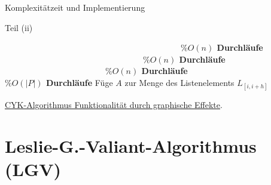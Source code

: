 \documentclass{beamer}
\begin{document}
	\begin{frame}{Komplexitätzeit und Implementierung}
		\begin{algorithm}[H]
			\caption[Teil (ii)]{Teil (ii)}
			\label{algorithm10}
			\begin{algorithmic}[1]
				 \ \ \ \ \ \ \ \ \ \ \ \ \ \ \ \ \ \ \ \ \ \ \ \ \ \ \ \ \ \ \ \ \ \ \ \ \ \ \ \ \ \ \textbf{$ \%O(n)$ Durchläufe}
				 \ \ \ \ \ \ \ \ \ \ \ \ \ \ \ \ \ \ \ \ \ \ \ \ \ \ \ \ \ \ \ \ \ \textbf{$ \%O(n)$ Durchläufe}
				 \ \ \ \ \ \ \ \ \ \ \ \ \ \ \ \ \ \ \ \ \ \ \ \ \textbf{$ \%O(n)$ Durchläufe}
				 \ \ \ \ \ \ \ \ \ \ \ \ \ \ \ \ \ \ \ \ \textbf{$\%O(|P|)$ Durchläufe}
				\State Füge $A$ zur Menge des Listenelements $L_{[i,i+h]}$
				\EndIf
				\EndFor
				\EndFor
				\EndFor
				\EndFor
			\end{algorithmic}
		\end{algorithm}
		 \href{http://www.cip.ifi.lmu.de/~lindebar/}{CYK-Algorithmus Funktionalität durch graphische Effekte}.
	\end{frame}
	
	
	
	\section{Leslie-G.-Valiant-Algorithmus (LGV)}
\end{document}
